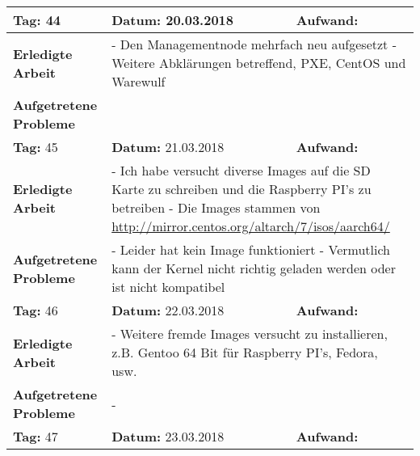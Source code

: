 \begin{longtable}{|p{5cm}|p{5cm}|p{6cm}|}
\rowcolor{heading}\textbf{Tag:} 44 & \textbf{Datum:} 20.03.2018 & \textbf{Aufwand:} \\ \hline
\textbf{Erledigte Arbeit} & \multicolumn{2}{p{11cm}|}{- Den Managementnode mehrfach neu aufgesetzt \newline
- Weitere Abklärungen betreffend, PXE, CentOS und Warewulf} \\ \hline
\textbf{Aufgetretene Probleme} & \multicolumn{2}{p{11cm}|}{} \\ \hline
\rowcolor{heading}\textbf{Tag:} 45 & \textbf{Datum:} 21.03.2018 & \textbf{Aufwand:} \\ \hline
\textbf{Erledigte Arbeit} & \multicolumn{2}{p{11cm}|}{- Ich habe versucht diverse Images auf die SD Karte zu schreiben und die Raspberry PI's zu betreiben \newline
- Die Images stammen von \url{http://mirror.centos.org/altarch/7/isos/aarch64/}} \\ \hline
\textbf{Aufgetretene Probleme} & \multicolumn{2}{p{11cm}|}{- Leider hat kein Image funktioniert \newline
- Vermutlich kann der Kernel nicht richtig geladen werden oder ist nicht kompatibel} \\ \hline
\rowcolor{heading}\textbf{Tag:} 46 & \textbf{Datum:} 22.03.2018 & \textbf{Aufwand:} \\ \hline
\textbf{Erledigte Arbeit} & \multicolumn{2}{p{11cm}|}{- Weitere fremde Images versucht zu installieren, z.B. Gentoo 64 Bit für Raspberry PI's, Fedora, usw.} \\ \hline
\textbf{Aufgetretene Probleme} & \multicolumn{2}{p{11cm}|}{-} \\ \hline
\rowcolor{heading}\textbf{Tag:} 47 & \textbf{Datum:} 23.03.2018 & \textbf{Aufwand:} \\ \hline

\end{longtable}

